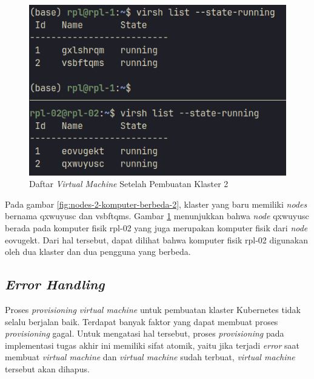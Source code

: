 \begin{figure}[H]
  \centering
  \includegraphics[scale=0.3]{gambar/ssh-nodes-list-2.png}
  \caption{Daftar \emph{Virtual Machine} Setelah Pembuatan Klaster 2}
  \label{fig:vm-komputer-fisik-2}
\end{figure}

Pada gambar \ref{fig:nodes-2-komputer-berbeda-2}, klaster yang baru
memiliki \emph{nodes} bernama qxwuyusc dan vsbftqms. Gambar \ref{fig:vm-komputer-fisik-2}
menunjukkan bahwa \emph{node} qxwuyusc berada pada komputer fisik rpl-02 yang juga
merupakan komputer fisik dari \emph{node} eovugekt. Dari hal tersebut, dapat
dilihat bahwa komputer fisik rpl-02 digunakan oleh dua klaster dan dua pengguna
yang berbeda.

\subsection{\emph{Error Handling}}
\label{subsec:error-handling}

Proses \emph{provisioning virtual machine} untuk pembuatan
klaster Kubernetes tidak selalu berjalan baik. Terdapat banyak
faktor yang dapat membuat proses \emph{provisioning} gagal. Untuk
mengatasi hal tersebut, proses \emph{provisioning} pada implementasi
tugas akhir ini memiliki sifat atomik, yaitu jika terjadi \emph{error}
saat membuat \emph{virtual machine} dan \emph{virtual machine} sudah terbuat,
\emph{virtual machine} tersebut akan dihapus.





